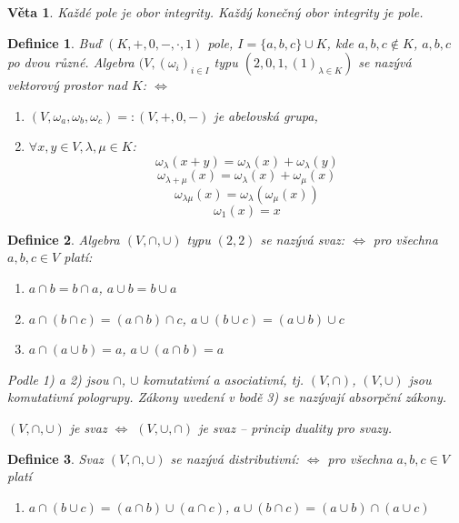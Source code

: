 \documentclass[a4paper, 11pt]{report}
\newtheorem{mydef}{Definice}[chapter]
\newtheorem{veta}{Věta}[chapter]
\begin{document}
\begin{veta}
Každé \emph{pole} je \emph{obor integrity}. Každý konečný obor integrity je pole.
\end{veta}

\begin{mydef}
Buď $(K, +, 0, -, \cdot, 1)$ pole, $I = \{a, b, c\} \cup K$, kde $a,b,c \not\in K$, $a,b,c$ po dvou různé. Algebra $(V, (\omega_i)_{i \in I}$ typu $(2, 0, 1, (1)_{\lambda \in K})$ se nazývá vektorový prostor nad $K$: $\Leftrightarrow$
\begin{enumerate}[1)]
	\item $(V, \omega_a, \omega_b, \omega_c) =: (V, +, 0, -)$ je abelovská grupa,
	\item $\forall x,y \in V, \lambda, \mu \in K$:\\
	$$\omega_\lambda(x + y) = \omega_\lambda(x) + \omega_\lambda(y) $$
	$$\omega_{\lambda + \mu}(x) = \omega_\lambda(x) + \omega_\mu(x) $$
	$$\omega_{\lambda \mu}(x) = \omega_\lambda( \omega_\mu(x)) $$
	$$\omega_1(x) = x $$
\end{enumerate}
\end{mydef}

\begin{mydef}
Algebra $(V, \cap, \cup)$ typu $(2, 2)$ se nazývá \emph{svaz}: $\Leftrightarrow$ pro všechna $a,b,c \in V$ platí:
\begin{enumerate}[1)]
	\item $a \cap b = b \cap a$,
		$a \cup b = b \cup a$
	\item $a \cap (b \cap c) = (a \cap b) \cap c$,
		$a \cup (b \cup c) = (a \cup b) \cup c$
	\item $a \cap (a \cup b) = a$,
		$a \cup (a \cap b) = a$
\end{enumerate}
Podle 1) a 2) jsou $\cap$, $\cup$ komutativní a asociativní, tj. $(V, \cap)$, $(V, \cup)$ jsou komutativní pologrupy. Zákony uvedení v bodě 3) se nazývají absorpční zákony.

$(V, \cap, \cup)$ je svaz $\Leftrightarrow$ $(V, \cup, \cap)$ je svaz -- princip duality pro svazy.
\end{mydef}

\begin{mydef}
Svaz $(V, \cap, \cup)$ se nazývá distributivní: $\Leftrightarrow$ pro všechna $a, b, c \in V$ platí 
\begin{enumerate}[4)]
	\item $a \cap (b \cup c) = (a \cap b) \cup (a \cap c)$,
		$a \cup (b \cap c) = (a \cup b) \cap (a \cup c)$
\end{enumerate}
\end{mydef}
\end{document}
